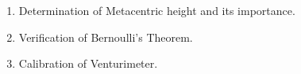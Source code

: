 \documentclass[12pt, a4paper]{article}
\begin{document}
                                                                                                                                                                                                                                                                                                                                                                                                                                                                                                                                                                                                                                                                                                                                                                        \begin{enumerate}[label=\arabic*.]
                                                                                                                                                                                                                                                                                                                                                                                                                                                                                                                                                                                                                                                                                                                                                                            \item Determination of Metacentric height and its importance.
                                                                                                                                                                                                                                                                                                                                                                                                                                                                                                                                                                                                                                                                                                                                                                                \item Verification of Bernoulli's Theorem.
                                                                                                                                                                                                                                                                                                                                                                                                                                                                                                                                                                                                                                                                                                                                                                                    \item Calibration of Venturimeter.

\end{enumerate}
\end{document}

